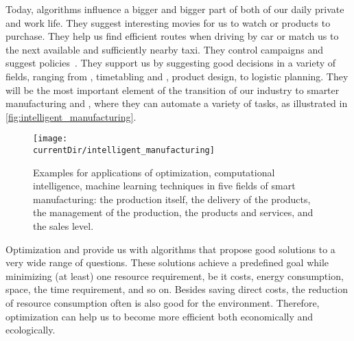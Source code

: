 \hsection{}%
%
%
Today, algorithms influence a bigger and bigger part of both of our daily private and work life.
They suggest interesting movies for us to watch or products to purchase.
They help us find efficient routes when driving by car or match us to the next available and sufficiently nearby taxi.
They control  campaigns and suggest  policies~\cite{MAM2021TROAIRWAFRAMG}.
They support us by suggesting good decisions in a variety of fields, ranging from , timetabling and , product design, to logistic planning.
They will be the most important element of the transition of our industry to smarter manufacturing and , where they can automate a variety of tasks, as illustrated in \autoref{fig:intelligent_manufacturing}.

\begin{figure}%
\centering%
\texttt{[image: \\currentDir/intelligent\_manufacturing]}%
\caption{%
Examples for applications of optimization, computational intelligence, machine learning techniques in five fields of smart manufacturing: the production itself, the delivery of the products, the management of the production, the products and services, and the sales level.}%
%
\label{fig:intelligent_manufacturing}%
\end{figure}%

Optimization and  provide us with algorithms that propose good solutions to a very wide range of questions.
These solutions achieve a predefined goal while minimizing (at least) one resource requirement, be it costs, energy consumption, space, the time requirement, and so on.
Besides saving direct costs, the reduction of resource consumption often is also good for the environment.
Therefore, optimization can help us to become more efficient both economically and ecologically.

